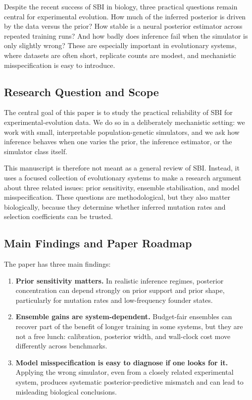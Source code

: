 \documentclass[11pt]{article}
\begin{document}
Despite the recent success of SBI in biology, three practical questions
remain central for experimental evolution.
How much of the inferred posterior is driven by the data versus the prior?
How stable is a neural posterior estimator across repeated training runs?
And how badly does inference fail when the simulator is only slightly wrong?
These are especially important in evolutionary systems, where datasets are
often short, replicate counts are modest, and mechanistic misspecification is
easy to introduce.

\subsection{Research Question and Scope}

The central goal of this paper is to study the practical reliability of SBI
for experimental-evolution data.
We do so in a deliberately mechanistic setting: we work with small,
interpretable population-genetic simulators, and we ask how inference
behaves when one varies the prior, the inference estimator, or the simulator
class itself.

This manuscript is therefore not meant as a general review of SBI.
Instead, it uses a focused collection of evolutionary systems to make a
research argument about three related issues: prior sensitivity, ensemble
stabilisation, and model misspecification.
These questions are methodological, but they also matter biologically,
because they determine whether inferred mutation rates and selection
coefficients can be trusted.

\subsection{Main Findings and Paper Roadmap}

The paper has three main findings:
\begin{enumerate}
  \item \textbf{Prior sensitivity matters.}
        In realistic inference regimes, posterior concentration can depend
        strongly on prior support and prior shape, particularly for mutation
        rates and low-frequency founder states.
  \item \textbf{Ensemble gains are system-dependent.}
        Budget-fair ensembles can recover part of the benefit of longer
        training in some systems, but they are not a free lunch:
        calibration, posterior width, and wall-clock cost move differently
        across benchmarks.
  \item \textbf{Model misspecification is easy to diagnose if one looks for
        it.}
        Applying the wrong simulator, even from a closely related
        experimental system, produces systematic posterior-predictive
        mismatch and can lead to misleading biological conclusions.
\end{enumerate}
\end{document}
